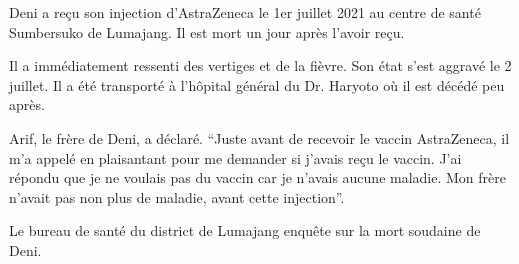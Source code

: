 Deni a reçu son injection d'AstraZeneca le 1er juillet 2021 au centre de santé
Sumbersuko de Lumajang. Il est mort un jour après l'avoir reçu.

Il a immédiatement ressenti des vertiges et de la fièvre. Son état s'est aggravé
le 2 juillet. Il a été transporté à l'hôpital général du Dr. Haryoto où il est
décédé peu après.

Arif, le frère de Deni, a déclaré. “Juste avant de recevoir le vaccin
AstraZeneca, il m'a appelé en plaisantant pour me demander si j'avais reçu le
vaccin. J'ai répondu que je ne voulais pas du vaccin car je n'avais aucune
maladie. Mon frère n'avait pas non plus de maladie, avant cette injection”.

Le bureau de santé du district de Lumajang enquête sur la mort soudaine de Deni.

